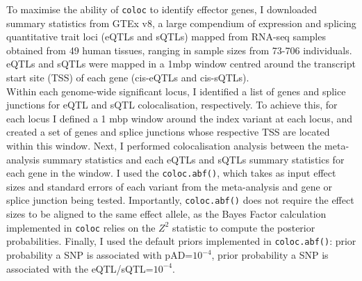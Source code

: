 To maximise the ability of \Verb+coloc+ to identify effector genes, I downloaded summary statistics from GTEx v8, a large compendium of expression and splicing quantitative trait loci (eQTLs and sQTLs) mapped from RNA-seq samples obtained from 49 human tissues, ranging in sample sizes from 73-706 individuals. eQTLs and sQTLs were mapped in a 1mbp window centred around the transcript start site (TSS) of each gene (cis-eQTLs and cis-sQTLs).\\

Within each genome-wide significant locus, I identified a list of genes and splice junctions for eQTL and sQTL colocalisation, respectively. To achieve this, for each locus I defined a 1 mbp window around the index variant at each locus, and created a set of genes and splice junctions whose respective TSS are located within this window. Next, I performed colocalisation analysis between the meta-analysis summary statistics and each eQTLs and sQTLs summary statistics for each gene in the window. I used the \Verb+coloc.abf()+, which takes as input effect sizes and standard errors of each variant from the meta-analysis and gene or splice junction being tested. Importantly, \Verb+coloc.abf()+ does not require the effect sizes to be aligned to the same effect allele, as the Bayes Factor calculation implemented in \Verb+coloc+ relies on the $Z^{2}$ statistic to compute the posterior probabilities. Finally, I used the default priors implemented in \Verb+coloc.abf()+: prior probability a SNP is associated with pAD=$10^{-4}$, prior probability a SNP is associated with the eQTL/sQTL=$10^{-4}$.

